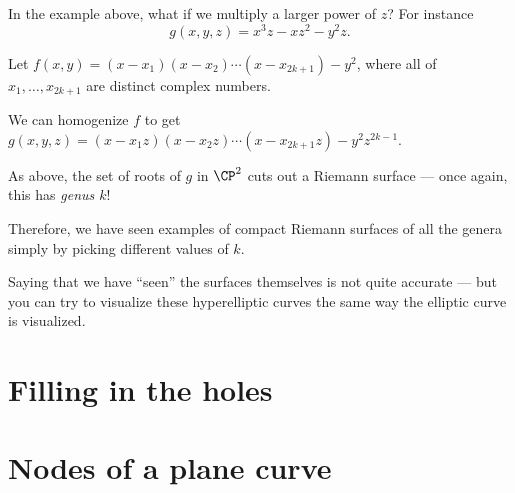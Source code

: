 \begin{exercise}
	In the example above, what if we multiply a larger power of $z$? For instance
	\[ g(x, y, z) = x^3 z-xz^2-y^2 z. \]
\end{exercise}

\begin{example}
	Let $f(x, y) = (x-x_1)(x-x_2) \dotsm (x-x_{2k+1}) - y^2$, where all of $x_1, \dots, x_{2k+1}$ are
	distinct complex numbers.

	We can homogenize $f$ to get $g(x, y, z) = (x-x_1 z)(x-x_2 z) \dotsm (x-x_{2k+1} z) - y^2
	z^{2k-1}$.

	As above, the set of roots of $g$ in $\CP^2$ cuts out a Riemann surface --- once again, this has
	\emph{genus $k$}!

	Therefore, we have seen examples of compact Riemann surfaces of all the genera simply by picking
	different values of $k$.
\end{example}
Saying that we have ``seen'' the surfaces themselves is not quite accurate ---
but you can try to visualize these hyperelliptic curves the same way the elliptic curve is
visualized.

\section{Filling in the holes}

\section{Nodes of a plane curve}


